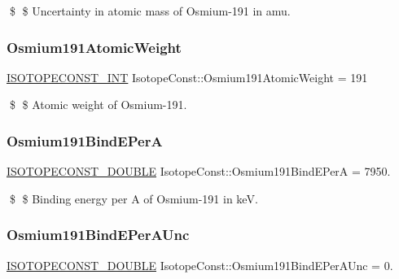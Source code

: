 \$ \$ Uncertainty in atomic mass of Osmium-\/191 in amu. \mbox{\label{group___isotope_const-_osmium-_os191_gab7eecec4766ab87f09895e927b5bc1e2}} 
\subsubsection{\texorpdfstring{Osmium191\+Atomic\+Weight}{Osmium191AtomicWeight}}
{\footnotesize\ttfamily \mbox{\hyperlink{group___isotope_const-_macros_ga5f18360b3e99483a35c32d789e62621c}{I\+S\+O\+T\+O\+P\+E\+C\+O\+N\+S\+T\+\_\+\+I\+NT}} Isotope\+Const\+::\+Osmium191\+Atomic\+Weight = 191}

\$ \$ Atomic weight of Osmium-\/191. \mbox{\label{group___isotope_const-_osmium-_os191_ga2ca183a79c07176dba23eac2dffaa2da}} 
\subsubsection{\texorpdfstring{Osmium191\+Bind\+E\+PerA}{Osmium191BindEPerA}}
{\footnotesize\ttfamily \mbox{\hyperlink{group___isotope_const-_macros_ga8f45a7272ce02c0b4c65c44636ed719a}{I\+S\+O\+T\+O\+P\+E\+C\+O\+N\+S\+T\+\_\+\+D\+O\+U\+B\+LE}} Isotope\+Const\+::\+Osmium191\+Bind\+E\+PerA = 7950.}

\$ \$ Binding energy per A of Osmium-\/191 in keV. \mbox{\label{group___isotope_const-_osmium-_os191_gadb8ec6efdeda93090bd1d236b11d30c8}} 
\subsubsection{\texorpdfstring{Osmium191\+Bind\+E\+Per\+A\+Unc}{Osmium191BindEPerAUnc}}
{\footnotesize\ttfamily \mbox{\hyperlink{group___isotope_const-_macros_ga8f45a7272ce02c0b4c65c44636ed719a}{I\+S\+O\+T\+O\+P\+E\+C\+O\+N\+S\+T\+\_\+\+D\+O\+U\+B\+LE}} Isotope\+Const\+::\+Osmium191\+Bind\+E\+Per\+A\+Unc = 0.}

